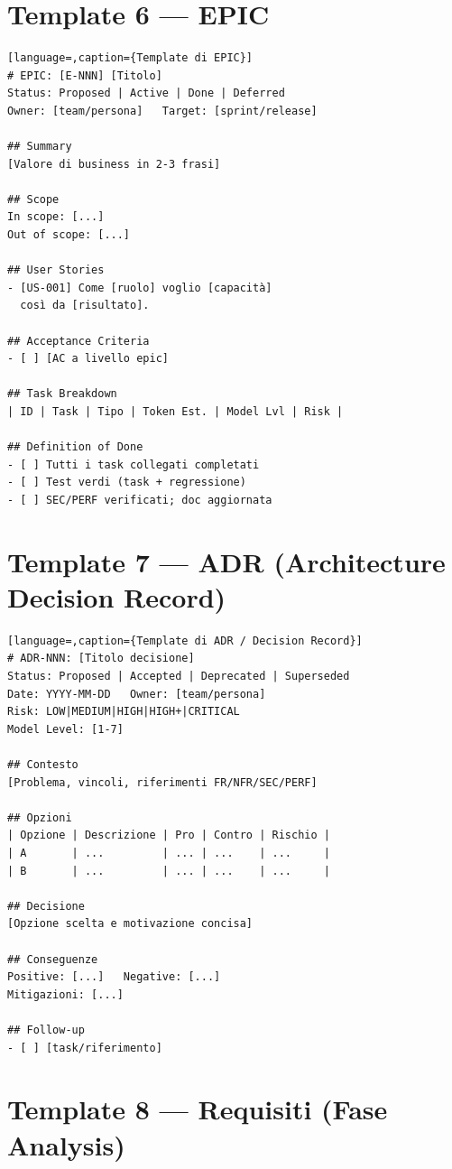 \section*{Template 6 --- EPIC}

\begin{lstlisting}[language=,caption={Template di EPIC}]
# EPIC: [E-NNN] [Titolo]
Status: Proposed | Active | Done | Deferred
Owner: [team/persona]   Target: [sprint/release]

## Summary
[Valore di business in 2-3 frasi]

## Scope
In scope: [...]
Out of scope: [...]

## User Stories
- [US-001] Come [ruolo] voglio [capacità]
  così da [risultato].

## Acceptance Criteria
- [ ] [AC a livello epic]

## Task Breakdown
| ID | Task | Tipo | Token Est. | Model Lvl | Risk |

## Definition of Done
- [ ] Tutti i task collegati completati
- [ ] Test verdi (task + regressione)
- [ ] SEC/PERF verificati; doc aggiornata
\end{lstlisting}

\section*{Template 7 --- ADR (Architecture Decision Record)}

\begin{lstlisting}[language=,caption={Template di ADR / Decision Record}]
# ADR-NNN: [Titolo decisione]
Status: Proposed | Accepted | Deprecated | Superseded
Date: YYYY-MM-DD   Owner: [team/persona]
Risk: LOW|MEDIUM|HIGH|HIGH+|CRITICAL
Model Level: [1-7]

## Contesto
[Problema, vincoli, riferimenti FR/NFR/SEC/PERF]

## Opzioni
| Opzione | Descrizione | Pro | Contro | Rischio |
| A       | ...         | ... | ...    | ...     |
| B       | ...         | ... | ...    | ...     |

## Decisione
[Opzione scelta e motivazione concisa]

## Conseguenze
Positive: [...]   Negative: [...]
Mitigazioni: [...]

## Follow-up
- [ ] [task/riferimento]
\end{lstlisting}

\section*{Template 8 --- Requisiti (Fase Analysis)}

